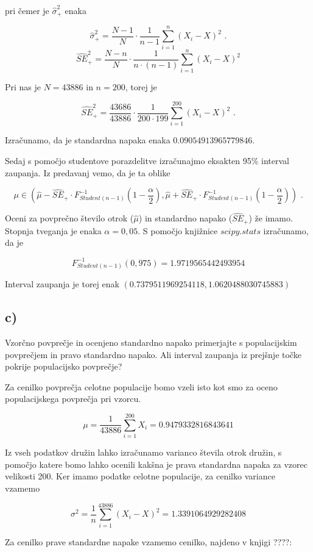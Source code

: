 \documentclass[12pt, a4paper]{article}
\begin{document}
pri čemer je $\hat{\sigma}_+^2$ enaka 

$$\hat{\sigma}_+^2 = \frac{N-1}{N} \cdot \frac{1}{n-1} \sum_{i=1}^{n} (X_i - X)^2 \text{ .} $$ $$
\hat{SE}_+^2 = \frac{N-n}{N} \cdot \frac{1}{n\cdot(n-1)} \sum_{i=1}^{n} (X_i - X)^2
$$

Pri nas je $ N = 43886 $ in $ n = 200 $, torej je

$$ \hat{SE}_+^2 = \frac{43686}{43886} \cdot \frac{1}{200\cdot199} \sum_{i=1}^{200} (X_i - X)^2 \text{ .}
$$

Izračunamo, da je standardna napaka enaka $ 0.09054913965779846 $.

Sedaj s pomočjo studentove porazdelitve izračunajmo eksakten 95\% interval zaupanja.
Iz predavanj vemo, da je ta oblike

$$ \mu \in (\hat{\mu} - \hat{SE}_+ \cdot F^{-1}_{Student(n-1)}(1-\frac{\alpha}{2}),\hat{\mu} + \hat{SE}_+ \cdot F^{-1}_{Student(n-1)}(1-\frac{\alpha}{2}) ) \text{ .}
$$

Oceni za povprečno število otrok ($\hat{\mu}$) in standardno napako ($\hat{SE}_+$)
že imamo. Stopnja tveganja je enaka $\alpha = 0,05$. S pomočjo knjižnice $scipy.stats$ izračunamo, da je 

$$ F^{-1}_{Student(n-1)}(0,975) = 1.9719565442493954
$$

Interval zaupanja je torej enak $(0.7379511969254118, 1.0620488030745883)$

\subsection{c)}
Vzorčno povprečje in ocenjeno standardno napako primerjajte s populacijskim
povprečjem in pravo standardno napako. Ali interval zaupanja iz prejšnje točke
pokrije populacijsko povprečje?

Za cenilko povprečja celotne populacije bomo vzeli isto kot smo za oceno populacijskega
povprečja pri vzorcu. 

$$ \mu = \frac{1}{43886}\sum^{200}_{i=1} X_i = 0.9479332816843641
$$

Iz vseh podatkov družin lahko izračunamo varianco števila otrok družin, s pomočjo
katere bomo lahko ocenili kakšna je prava standardna napaka za vzorec velikosti 200.
Ker imamo podatke celotne populacije, za cenilko variance vzamemo

$$ \sigma^2 = \frac{1}{n} \sum_{i=1}^{43886} (X_i - X)^2 = 1.3391064929282408
$$

Za cenilko prave standardne napake vzamemo cenilko, najdeno v knjigi ????:
\end{document}
